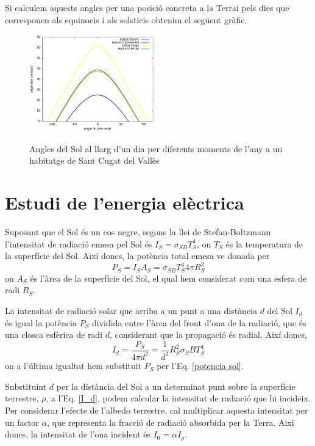 \documentclass[11pt]{article}
\begin{document}
Si calculem aquests angles per una posició concreta a la Terrai pels dies que corresponen als equinocis i als solsticis obtenim el següent gràfic.
\begin{figure}[H]
    \centering
    \includegraphics[width=0.5\textwidth]{equinocis.png}
    \label{solsticis}
    \caption{Angles del Sol al llarg d'un dia per diferents moments de l'any a un habitatge de Sant Cugat del Vallès}
\end{figure}

\section{Estudi de l'energia elèctrica}
Suposant que el Sol és un cos negre, segons la llei de Stefan-Boltzmann l'intensitat de radiació emesa pel Sol és $I_S = \sigma_{SB}T_S^4$, on $T_S$ és la temperatura de la superfície del Sol. Així doncs, la potència total emesa ve donada per
\begin{equation}
    P_S = I_SA_S=\sigma_{SB}T_S^4 4 \pi R_S^2
    \label{potencia sol}
\end{equation}
on $A_S$ és l'àrea de la superfície del Sol, el qual hem considerat com una esfera de radi $R_S$.

La intensitat de radiació solar que arriba a un punt a una distància $d$ del Sol $I_d$ és igual la potència $P_S$ dividida entre l'àrea del front d'ona de la radiació, que és una closca esfèrica de radi $d$, considerant que la propagació és radial. Així doncs,
\begin{equation}
    I_d = \frac{P_S}{4\pi d^2}=\frac{1}{d^2}R_S^2\sigma_SB T_S^4
    \label{I_d}
\end{equation}
on a l'última igualtat hem substituit $P_S$ per l'Eq. \eqref{potencia sol}.

Substituint $d$ per la distància del Sol a un determinat punt sobre la superfície terrestre, $\rho$, a l'Eq. \eqref{I_d}, podem calcular la intensitat de radiació que hi incideix. Per considerar l’efecte de l’albedo terrestre, cal multiplicar aquesta intensitat per un factor $\alpha$, que representa la fracció de radiació absorbida per la Terra. Així doncs, la intensitat de l'ona incident és $I_0=\alpha I_{\rho}$.
\end{document}
